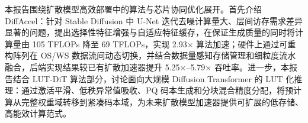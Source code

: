 




本报告围绕扩散模型高效部署中的算法与芯片协同优化展开。首先介绍 DiffAccel：针对 Stable Diffusion 中 U-Net 迭代去噪计算量大、层间访存需求差异显著的问题，提出选择性特征增强与自适应特征缓存，在保证生成质量的同时将计算量由 105 TFLOPs 降至 69 TFLOPs，实现 2.93× 算法加速；硬件上通过可重构阵列在 OS/WS 数据流间动态切换，并结合数据量感知存储管理和细粒度流水融合，后端实现结果较已有扩散加速器提升 5.25×–5.79× 吞吐率。进一步，本报告结合 LUT-DiT 算法部分，讨论面向大规模 Diffusion Transformer 的 LUT 化推理：通过激活平滑、低秩异常值吸收、PQ 码本生成和分块混合精度分配，将预计算从完整权重域转移到紧凑码本域，为未来扩散模型加速器提供可扩展的低存储、高能效计算范式。